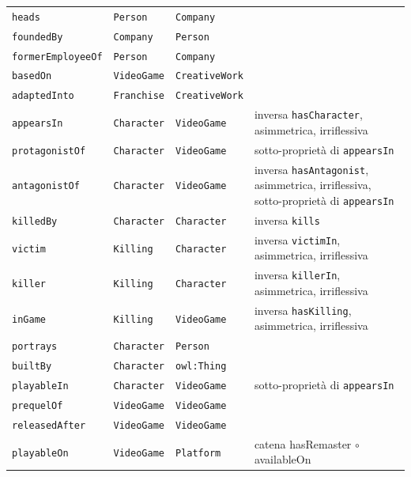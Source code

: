 \begin{longtable}{lllp{6cm}}
\texttt{heads} & \texttt{Person} & \texttt{Company} &  \\
\texttt{foundedBy} & \texttt{Company} & \texttt{Person} &  \\
\texttt{formerEmployeeOf} & \texttt{Person} & \texttt{Company} &  \\
\texttt{basedOn} & \texttt{VideoGame} & \texttt{CreativeWork} &  \\
\texttt{adaptedInto} & \texttt{Franchise} & \texttt{CreativeWork} &  \\
\texttt{appearsIn} & \texttt{Character} & \texttt{VideoGame} & inversa \texttt{hasCharacter}, asimmetrica, irriflessiva \\
\texttt{protagonistOf} & \texttt{Character} & \texttt{VideoGame} & sotto-proprietà di \texttt{appearsIn} \\
\texttt{antagonistOf} & \texttt{Character} & \texttt{VideoGame} & inversa \texttt{hasAntagonist}, asimmetrica, irriflessiva, sotto-proprietà di \texttt{appearsIn} \\
\texttt{killedBy} & \texttt{Character} & \texttt{Character} & inversa \texttt{kills} \\
\texttt{victim} & \texttt{Killing} & \texttt{Character} & inversa \texttt{victimIn}, asimmetrica, irriflessiva \\
\texttt{killer} & \texttt{Killing} & \texttt{Character} & inversa \texttt{killerIn}, asimmetrica, irriflessiva \\
\texttt{inGame} & \texttt{Killing} & \texttt{VideoGame} & inversa \texttt{hasKilling}, asimmetrica, irriflessiva \\
\texttt{portrays} & \texttt{Character} & \texttt{Person} &  \\
\texttt{builtBy} & \texttt{Character} & \texttt{owl:Thing} &  \\
\texttt{playableIn} & \texttt{Character} & \texttt{VideoGame} & sotto-proprietà di \texttt{appearsIn} \\
\texttt{prequelOf} & \texttt{VideoGame} & \texttt{VideoGame} &  \\
\texttt{releasedAfter} & \texttt{VideoGame} & \texttt{VideoGame} &  \\
\texttt{playableOn} & \texttt{VideoGame} & \texttt{Platform} & catena hasRemaster $\circ$ availableOn \\
\end{longtable}\endgroup

